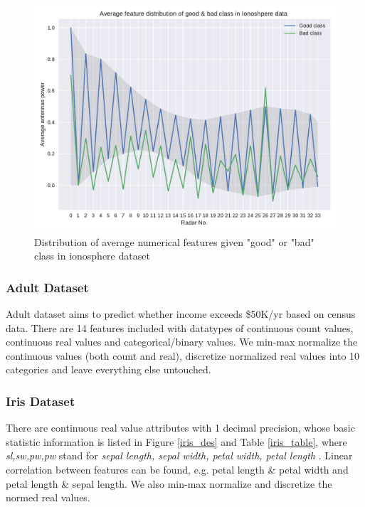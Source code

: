 \documentclass[11pt]{scrartcl}
\begin{document}
\begin{figure}[t]
	\centering
	\includegraphics[width=0.8\linewidth]{fig/iono_feat_dist.pdf}
	\caption{Distribution of average numerical features given "good" or "bad" class in ionosphere dataset}
	\label{iono_feat}
\end{figure}

\subsubsection*{Adult Dataset}
Adult dataset aims to predict whether income exceeds \$50K/yr based on census data\cite{kohavi1996scaling}. There are 14 features included with datatypes of continuous count values, continuous real values and categorical/binary values. We min-max normalize the continuous values (both count and real),  discretize normalized real values into 10 categories and leave everything else untouched.


\subsubsection*{Iris Dataset}
There are continuous real value attributes with 1 decimal precision, whose basic statistic information is listed in Figure \ref{iris_des} and Table \ref{iris_table}, where \textit{sl,sw,pw,pw} stand for \textit{sepal length, sepal width, petal width, petal length} \cite{fisher1936use}. Linear correlation between features can be found, e.g. petal length \& petal width and petal length \& sepal length. We also min-max normalize and discretize the normed real values.
\end{document}

